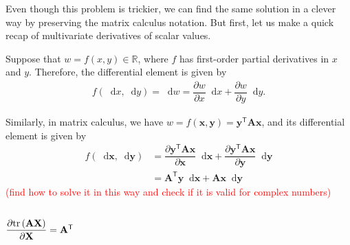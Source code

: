 \documentclass{article}
\newcommand{\trans}{\mathsf{T}}
\newcommand{\obs}[1]{\textcolor{red}{(#1)}}
\newcommand*\diff{\mathop{}\!\mathrm{d}}
\begin{document}
Even though this problem is trickier, we can find the same solution in a clever way by preserving the matrix calculus notation. But first, let us make a quick recap of multivariate derivatives of scalar values.

Suppose that \(w = f(x, y) \in \mathbb{R}\), where \(f\) has first-order partial derivatives in \(x\) and \(y\). Therefore, the differential element is given by
\begin{align}
    f(\diff x, \diff y) = \diff w = \dfrac{\partial w}{\partial x} \diff x + \dfrac{\partial w}{\partial y} \diff y.
\end{align}

Similarly, in matrix calculus, we have \(w = f(\mathbf{x}, \mathbf{y}) = \mathbf{y}^\trans \mathbf{A} \mathbf{x} \), and its differential element is given by
\begin{align}
    f(\diff \mathbf{x}, \diff \mathbf{y}) & = \dfrac{\partial \mathbf{y}^\trans \mathbf{A} \mathbf{x}}{\partial \mathbf{x}} \diff \mathbf{x} + \dfrac{\partial \mathbf{y}^\trans \mathbf{A} \mathbf{x}}{\partial \mathbf{y}} \diff \mathbf{y} \\
    & = \mathbf{A}^\trans \mathbf{y} \diff \mathbf{x} + \mathbf{A} \mathbf{x} \diff \mathbf{y}
\end{align}
\obs{find how to solve it in this way and check if it is valid for complex numbers}

\subsection{\(\dfrac{\partial \textnormal{tr}\left(\mathbf{A} \mathbf{X}\right)}{\partial \mathbf{X}} = \mathbf{A}^\trans\)}
\end{document}
